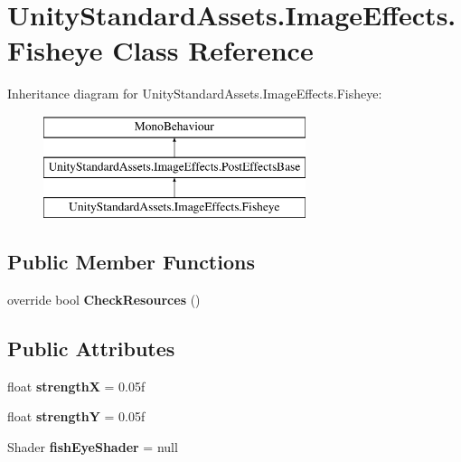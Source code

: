 \hypertarget{class_unity_standard_assets_1_1_image_effects_1_1_fisheye}{}\section{Unity\+Standard\+Assets.\+Image\+Effects.\+Fisheye Class Reference}
\label{class_unity_standard_assets_1_1_image_effects_1_1_fisheye}
Inheritance diagram for Unity\+Standard\+Assets.\+Image\+Effects.\+Fisheye\+:\begin{figure}[H]
\begin{center}
\leavevmode
\includegraphics[height=3.000000cm]{class_unity_standard_assets_1_1_image_effects_1_1_fisheye}
\end{center}
\end{figure}
\subsection*{Public Member Functions}
\begin{DoxyCompactItemize}
\item 
override bool {\bfseries Check\+Resources} ()\hypertarget{class_unity_standard_assets_1_1_image_effects_1_1_fisheye_aab758a8fa12b52a196cec8cdd9e66c03}{}\label{class_unity_standard_assets_1_1_image_effects_1_1_fisheye_aab758a8fa12b52a196cec8cdd9e66c03}

\end{DoxyCompactItemize}
\subsection*{Public Attributes}
\begin{DoxyCompactItemize}
\item 
float {\bfseries strengthX} = 0.\+05f\hypertarget{class_unity_standard_assets_1_1_image_effects_1_1_fisheye_ac744dacc09e3b47d06a5022671ec92cd}{}\label{class_unity_standard_assets_1_1_image_effects_1_1_fisheye_ac744dacc09e3b47d06a5022671ec92cd}

\item 
float {\bfseries strengthY} = 0.\+05f\hypertarget{class_unity_standard_assets_1_1_image_effects_1_1_fisheye_ac9a0d9f7b2b959fbd2c11ecc7148df46}{}\label{class_unity_standard_assets_1_1_image_effects_1_1_fisheye_ac9a0d9f7b2b959fbd2c11ecc7148df46}

\item 
Shader {\bfseries fish\+Eye\+Shader} = null\hypertarget{class_unity_standard_assets_1_1_image_effects_1_1_fisheye_a4c87877e346e53dbfe52b106a8b01f28}{}\label{class_unity_standard_assets_1_1_image_effects_1_1_fisheye_a4c87877e346e53dbfe52b106a8b01f28}

\end{DoxyCompactItemize}
